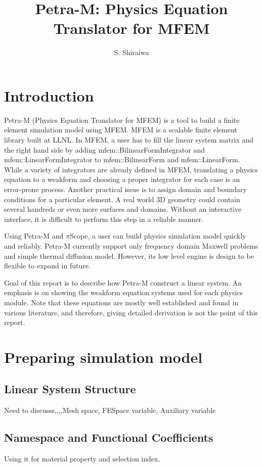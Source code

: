 \documentclass[11pt,a4paper,final]{report}
\author{S. Shiraiwa}
\title{Petra-M: Physics Equation Translator for MFEM}
\begin{document}
\lstset{language=Python}
\maketitle
\tableofcontents
\newpage

\chapter{Introduction}
Petra-M (Physics Equation Translator for MFEM) is a tool to build a finite element simulation model using MFEM. 
MFEM is a scalable finite element library built at LLNL. In MFEM,  a user has to fill the linear system matrix and the right hand side by adding  mfem::BilinearFormIntegrator and mfem::LinearFormIntegrator to mfem::BilinearForm and mfem::LinearForm.
While a variety of integrators are already defined in MFEM, translating a physics equation to a weakform and choosing a proper integrator for each case is an error-prone process. 
Another practical issue is to assign domain and boundary conditions for a particular element. A real world 3D geometry could contain several handreds or even more surfaces and domains. Without an interactive interface, it is difficult to perform this step in a reliable manner.

Using Petra-M and $\pi$Scope, a user can build physics simulation model quickly and reliably. Petra-M currently support only frequency domain Maxwell problems and simple thermal diffusion model. However, its low level engine is design to be flexible to expand in future.

Goal of this report is to describe how Petra-M construct a linear system. An emphasis is on showing the weakform equation systems used for each physics module. Note that these equations are mostly well established and found in various literature, and therefore, giving detailed derivation is not the point of this report. 


\chapter{Preparing simulation model}
\section{Linear System Structure}
Need to discusss,,,,Mesh space, FESpace variable, Auxiliary variable

\section{Namespace and Functional Coefficients}
Using it for material property and selection index.
\end{document}
